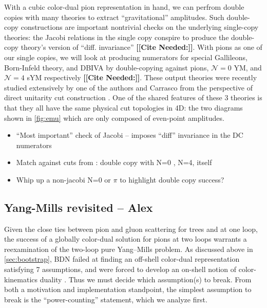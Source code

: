 \documentclass[11pt,letter]{article}
\newcommand{\citepls}[1]{{\bf\color{red}[[Cite Needed:#1]]}}
\begin{document}
With a cubic color-dual pion representation in hand, we can perfrom
double copies with many theories to extract ``gravitational''
amplitudes.  Such double-copy constructions are important nontrivial
checks on the underlying single-copy theories: the Jacobi relations in
the single copy conspire to produce the double-copy theory's version
of ``diff. invariance'' \citepls{}.  With pions as one of our single
copies, we will look at producing numerators for special Gallileons,
Born-Infeld theory, and DBIVA by double-copying against pions,
$\mathcal{N}=0$ YM, and $\mathcal{N}=4$ sYM respectively \citepls{}.
These output theories were recently studied extensively by one of the
authors and Carrasco from the perspective of direct unitarity cut
construction \cite{Carrasco:2023qgz}.  One of the shared features of
these 3 theories is that they all have the same physical cut
topologies in 4D: the two diagrams shown in \cref{fig:emu} which are
only composed of even-point amplitudes.




\begin{itemize}
\item  ``Most important'' check of Jacobi -- imposes ``diff'' invariance in the DC numerators
\item Match against cuts from \cite{Carrasco:2023qgz}: double copy
  with N=0 \cite{Bern:2015ooa}, N=4, itself
  \item Whip up a non-jacobi N=0 or $\pi$ to highlight double copy success?
\end{itemize}

\subsection{Yang-Mills revisited -- Alex}
Given the close ties between pion and gluon scattering for trees and
at one loop, the success of a globally color-dual solution for pions
at two loops warrants a reexamination of the two-loop pure Yang--Mills
problem.  As discussed above in \cref{sec:bootstrap}, BDN failed at
finding an off-shell color-dual representation satisfying 7
assumptions, and were forced to develop an on-shell notion of
color-kinematics duality \cite{Bern:2015ooa}.  Thus we must decide
which assumption(s) to break.  From both a motivation and
implementation standpoint, the simplest assumption to break is the
``power-counting'' statement, which we analyze first.
\end{document}
